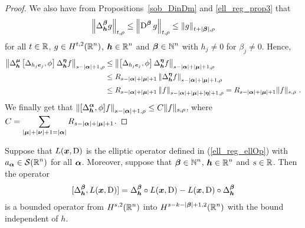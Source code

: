 \begin{proof}
We also have from Propositions~\ref{sob_DinDm} and \ref{ell_reg_prop3}
that
\begin{equation} \label{DeltaBoundOpEq4}
\left\| \Delta^{{\bm{\beta}}}_{{\bm{h}}} g \right\|_{t,\rho}
\leq \left\| \operatorname{D}^{{\bm{\beta}}} g \right\|_{t,\rho}
\leq \left\| g \right\|_{t+|{\bm{\beta}}|,\rho}
\end{equation}
for all $t\in \mathbb{R}$, $\displaystyle g \in H^{t,2}(\mathbb{R}^n)$,
$\displaystyle {\bm{h}} \in \mathbb{R}^n$ and
$\displaystyle {\bm{\beta}} \in \mathbb{N}^n$ with $h_j \neq 0$ for
$\beta_j \neq 0$.  Hence,
\begin{align*}
\left\| \Delta^{{\bm{\mu}}}_{{\bm{h}}} \left[
\Delta_{h_j {\bm{e}}_j}, \phi\right] \Delta^{{\bm{\eta}}}_{{\bm{h}}} f
\right\|_{s-|{\bm{\alpha}}|+1,\rho}
&\leq \left\| \left[ \Delta_{h_j {\bm{e}}_j}, \phi\right]
\Delta^{{\bm{\eta}}}_{{\bm{h}}}
f\right\|_{s-|{\bm{\alpha}}|+|{\bm{\mu}}|+1,\rho} \\
&\leq R_{s-|{\bm{\alpha}}|+|{\bm{\mu}}|+1}
\left\| \Delta^{{\bm{\eta}}}_{{\bm{h}}} f
\right\|_{s-|{\bm{\alpha}}|+|{\bm{\mu}}|+1,\rho} \\
& \leq R_{s-|{\bm{\alpha}}|+|{\bm{\mu}}|+1}
\left\| f \right\|_{s-|{\bm{\alpha}}|+|{\bm{\mu}}|+|{\bm{\eta}}|+1,\rho}
= R_{s-|{\bm{\alpha}}|+|{\bm{\mu}}|+1} \|f\|_{s,\rho} \ .
\end{align*}
We finally get that
$\displaystyle 
\left\| [\Delta^{{\bm{\alpha}}}_{{\bm{h}}}, \phi] f \right\|_{s-|{\bm{\alpha}}|+1,\rho}
\leq C \|f\|_{s,\rho}$, where
$\displaystyle C = \sum_{|{\bm{\mu}}|+|{\bm{\nu}}|+1 = |{\bm{\alpha}}|}
R_{s-|{\bm{\alpha}}|+|{\bm{\mu}}|+1}$.
\end{proof}

\begin{cor} \label{ell_reg_cor1}
Suppose that $L({\bm{x}},\operatorname{D})$ is the elliptic operator defined
in (\ref{ell_reg_ellOp}) with $\displaystyle a_{{\bm{\alpha}}} \in \mathcal{S}(\mathbb{R}^n)$
for all ${\bm{\alpha}}$.  Moreover, suppose that
$\displaystyle {\bm{\beta}} \in \mathbb{N}^n$, $\displaystyle {\bm{h}}\in \mathbb{R}^n$ and
$s \in \mathbb{R}$.  Then the operator
\[
[\Delta^{{\bm{\beta}}}_{{\bm{h}}}, L({\bm{x}},\operatorname{D})]
= \Delta^{{\bm{\beta}}}_{{\bm{h}}} \circ L({\bm{x}},\operatorname{D}) - L({\bm{x}},\operatorname{D})
\circ \Delta^{{\bm{\beta}}}_{{\bm{h}}}
\]
is a bounded operator from $\displaystyle H^{s,2}(\mathbb{R}^n)$ into
$\displaystyle H^{s-k-|{\bm{\beta}}|+1,2}(\mathbb{R}^n)$ with the bound
independent of $h$.
\end{cor}

